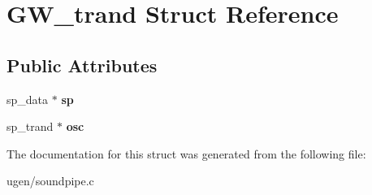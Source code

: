 \hypertarget{structGW__trand}{}\section{G\+W\+\_\+trand Struct Reference}
\label{structGW__trand}
\subsection*{Public Attributes}
\begin{DoxyCompactItemize}
\item 
\hypertarget{structGW__trand_ac324629262671164e9109a72c28afd25}{}\label{structGW__trand_ac324629262671164e9109a72c28afd25} 
sp\+\_\+data $\ast$ {\bfseries sp}
\item 
\hypertarget{structGW__trand_a2271275b06ae53a332e14cd68696cc71}{}\label{structGW__trand_a2271275b06ae53a332e14cd68696cc71} 
sp\+\_\+trand $\ast$ {\bfseries osc}
\end{DoxyCompactItemize}


The documentation for this struct was generated from the following file\+:\begin{DoxyCompactItemize}
\item 
ugen/soundpipe.\+c\end{DoxyCompactItemize}
